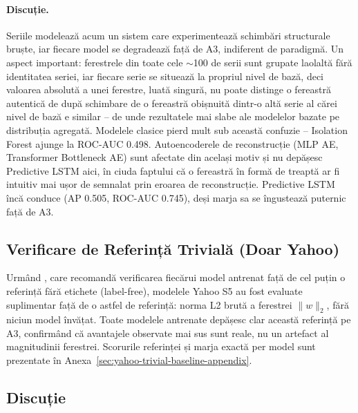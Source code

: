 \paragraph{Discuție.} Seriile modelează acum un sistem care experimentează schimbări structurale bruște, iar fiecare model se degradează față de A3, indiferent de paradigmă. Un aspect important: ferestrele din toate cele $\sim$100 de serii sunt grupate laolaltă fără identitatea seriei, iar fiecare serie se situează la propriul nivel de bază, deci valoarea absolută a unei ferestre, luată singură, nu poate distinge o fereastră autentică de după schimbare de o fereastră obișnuită dintr-o altă serie al cărei nivel de bază e similar -- de unde rezultatele mai slabe ale modelelor bazate pe distribuția agregată.
Modelele clasice pierd mult sub această confuzie -- Isolation Forest ajunge la ROC-AUC 0.498. Autoencoderele de reconstrucție (MLP AE, Transformer Bottleneck AE) sunt afectate din același motiv și nu depășesc Predictive LSTM aici, în ciuda faptului că o fereastră în formă de treaptă ar fi intuitiv mai ușor de semnalat prin eroarea de reconstrucție.
Predictive LSTM încă conduce (AP 0.505, ROC-AUC 0.745), deși marja sa se îngustează puternic față de A3.

\subsection{Verificare de Referință Trivială (Doar Yahoo)}
\label{sec:yahoo-trivial-baseline}

Urmând \textcite{kim2022rigorous}, care recomandă verificarea fiecărui model antrenat față de cel puțin o referință fără etichete (label-free), modelele Yahoo S5 au fost evaluate suplimentar față de o astfel de referință: norma L2 brută a ferestrei $\lVert w \rVert_2$, fără niciun model învățat. Toate modelele antrenate depășesc clar această referință pe A3, confirmând că avantajele observate mai sus sunt reale, nu un artefact al magnitudinii ferestrei. Scorurile referinței și marja exactă per model sunt prezentate în Anexa~\ref{sec:yahoo-trivial-baseline-appendix}.

\subsection{Discuție}

